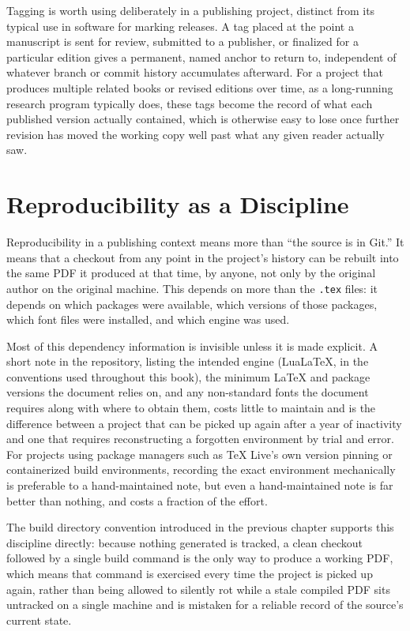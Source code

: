Tagging is worth using deliberately in a publishing project, distinct from its typical use in software for marking releases. A tag placed at the point a manuscript is sent for review, submitted to a publisher, or finalized for a particular edition gives a permanent, named anchor to return to, independent of whatever branch or commit history accumulates afterward. For a project that produces multiple related books or revised editions over time, as a long-running research program typically does, these tags become the record of what each published version actually contained, which is otherwise easy to lose once further revision has moved the working copy well past what any given reader actually saw.

\hypertarget{reproducibility-as-a-discipline}{%
\section{Reproducibility as a Discipline}\label{reproducibility-as-a-discipline}}

Reproducibility in a publishing context means more than ``the source is in Git.'' It means that a checkout from any point in the project's history can be rebuilt into the same PDF it produced at that time, by anyone, not only by the original author on the original machine. This depends on more than the \texttt{.tex} files: it depends on which packages were available, which versions of those packages, which font files were installed, and which engine was used.

Most of this dependency information is invisible unless it is made explicit. A short note in the repository, listing the intended engine (LuaLaTeX, in the conventions used throughout this book), the minimum LaTeX and package versions the document relies on, and any non-standard fonts the document requires along with where to obtain them, costs little to maintain and is the difference between a project that can be picked up again after a year of inactivity and one that requires reconstructing a forgotten environment by trial and error. For projects using package managers such as TeX Live's own version pinning or containerized build environments, recording the exact environment mechanically is preferable to a hand-maintained note, but even a hand-maintained note is far better than nothing, and costs a fraction of the effort.

The build directory convention introduced in the previous chapter supports this discipline directly: because nothing generated is tracked, a clean checkout followed by a single build command is the only way to produce a working PDF, which means that command is exercised every time the project is picked up again, rather than being allowed to silently rot while a stale compiled PDF sits untracked on a single machine and is mistaken for a reliable record of the source's current state.
